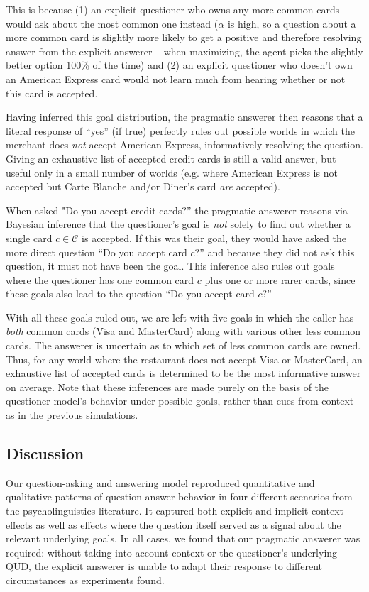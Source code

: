 \documentclass[12pt, floatsintext, jou]{apa6}
\begin{document}
This is because (1) an explicit questioner who owns any more common cards would ask about the most common one instead ($\alpha$ is high, so a question about a more common card is slightly more likely to get a positive and therefore resolving answer from the explicit answerer -- when maximizing, the agent picks the slightly better option 100\% of the time) and (2) an explicit questioner who doesn't own an American Express card would not learn much from hearing whether or not this card is accepted. 

Having inferred this goal distribution, the pragmatic answerer then reasons that a literal response of ``yes'' (if true) perfectly rules out possible worlds in which the merchant does \emph{not} accept American Express, informatively resolving the question. Giving an exhaustive list of accepted credit cards is still a valid answer, but useful only in a small number of worlds (e.g. where American Express is not accepted but Carte Blanche and/or Diner's card \emph{are} accepted).

When asked "Do you accept credit cards?'' the pragmatic answerer reasons via Bayesian inference that the questioner's goal is \emph{not} solely to find out whether a single card $c \in \mathcal{C}$ is accepted. If this was their goal, they would have asked the more direct question ``Do you accept card $c$?'' and because they did not ask this question, it must not have been the goal. This inference also rules out goals where the questioner has one common card $c$ plus one or more rarer cards, since these goals also lead to the question ``Do you accept card $c$?'' 

With all these goals ruled out, we are left with five goals in which the caller has \emph{both} common cards (Visa and MasterCard) along with various other less common cards. The answerer is uncertain as to which set of less common cards are owned. Thus, for any world where the restaurant does not accept Visa or MasterCard, an exhaustive list of accepted cards is determined to be the most informative answer on average. Note that these inferences are made purely on the basis of the questioner model's behavior under possible goals, rather than cues from context as in the previous simulations.

\subsection{Discussion}

Our question-asking and answering model reproduced quantitative and qualitative patterns of question-answer behavior in four different scenarios from the psycholinguistics literature. It captured both explicit and implicit context effects as well as effects where the question itself served as a signal about the relevant underlying goals. In all cases, we found that our pragmatic answerer was required: without taking into account context or the questioner's underlying QUD, the explicit answerer is unable to adapt their response to different circumstances as experiments found.
\end{document}
